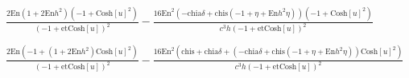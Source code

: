 \documentclass{article}
\begin{document}
\begin{doublespace}
\noindent\(\frac{2 \text{En} \left(1+2 \text{En} h^2\right) \left(-1+\text{Cosh}[u]^2\right)}{(-1+\text{et} \text{Cosh}[u])^2}-\frac{16 \text{En}^2
\left(-\text{chia} \delta +\text{chis} \left(-1+\eta +\text{En} h^2 \eta \right)\right) \left(-1+\text{Cosh}[u]^2\right)}{c^3 h (-1+\text{et} \text{Cosh}[u])^2}\)
\end{doublespace}

\begin{doublespace}
\noindent\(\frac{2 \text{En} \left(-1+\left(1+2 \text{En} h^2\right) \text{Cosh}[u]^2\right)}{(-1+\text{et} \text{Cosh}[u])^2}-\frac{16 \text{En}^2
\left(\text{chis}+\text{chia} \delta +\left(-\text{chia} \delta +\text{chis} \left(-1+\eta +\text{En} h^2 \eta \right)\right) \text{Cosh}[u]^2\right)}{c^3
h (-1+\text{et} \text{Cosh}[u])^2}\)
\end{doublespace}
\end{document}
